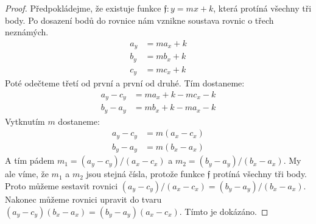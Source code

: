 \begin{proof}
    Předpokládejme, že existuje funkce $\mathfrak{f}: y = mx+k$, která protíná všechny tři body. Po dosazení bodů do rovnice nám vznikne soustava rovnic o třech neznámých. 
    \begin{align*}
        a_y &= ma_x+k \\
        b_y &= mb_x+k \\
        c_y &= mc_x+k 
    \end{align*}
    Poté odečteme třetí od první a první od druhé. Tím dostaneme:
    \begin{align*}
        a_y-c_y &= ma_x+k - mc_x -k \\
        b_y-a_y &= mb_x+k -ma_x -k 
    \end{align*}
    Vytknutím $m$ dostaneme:
    \begin{align*}
        a_y-c_y &= m(a_x-c_x) \\
        b_y-a_y &= m(b_x-a_x) 
    \end{align*}
    A tím pádem $m_1 = (a_y-c_y)/(a_x-c_x)$ a $ m_2=(b_y-a_y)/(b_x-a_x)$. My ale víme, že $m_1$ a $m_2$ jsou stejná čísla, protože funkce $\mathfrak{f}$ protíná všechny tři body. Proto můžeme sestavit rovnici $(a_y-c_y)/(a_x-c_x) = (b_y-a_y)/(b_x-a_x)$. Nakonec můžeme rovnici upravit do tvaru $(a_y-c_y)(b_x-a_x) = (b_y-a_y)(a_x-c_x)$. Tímto je  dokázáno.
\end{proof}